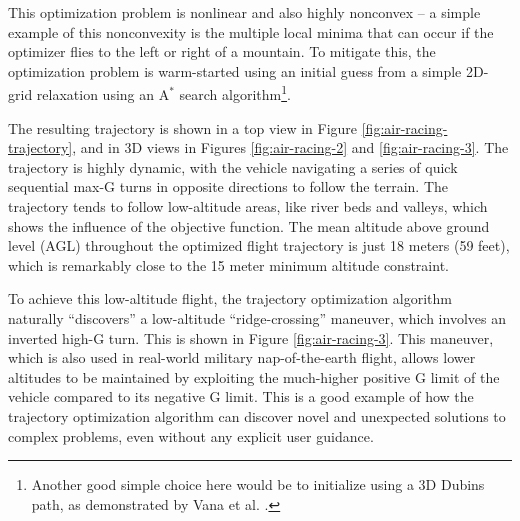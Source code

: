 This optimization problem is nonlinear and also highly nonconvex -- a simple example of this nonconvexity is the multiple local minima that can occur if the optimizer flies to the left or right of a mountain. To mitigate this, the optimization problem is warm-started using an initial guess from a simple 2D-grid relaxation using an $\mathrm{A}^*$ search algorithm\footnote{Another good simple choice here would be to initialize using a 3D Dubins path, as demonstrated by Vana et al. \cite{vana20minimal}.}.

The resulting trajectory is shown in a top view in Figure \ref{fig:air-racing-trajectory}, and in 3D views in Figures \ref{fig:air-racing-2} and \ref{fig:air-racing-3}. The trajectory is highly dynamic, with the vehicle navigating a series of quick sequential max-G turns in opposite directions to follow the terrain. The trajectory tends to follow low-altitude areas, like river beds and valleys, which shows the influence of the objective function. The mean altitude above ground level (AGL) throughout the optimized flight trajectory is just 18 meters (59 feet), which is remarkably close to the 15 meter minimum altitude constraint.

To achieve this low-altitude flight, the trajectory optimization algorithm naturally ``discovers'' a low-altitude ``ridge-crossing'' maneuver, which involves an inverted high-G turn. This is shown in Figure \ref{fig:air-racing-3}. This maneuver, which is also used in real-world military nap-of-the-earth flight, allows lower altitudes to be maintained by exploiting the much-higher positive G limit of the vehicle compared to its negative G limit. This is a good example of how the trajectory optimization algorithm can discover novel and unexpected solutions to complex problems, even without any explicit user guidance.

